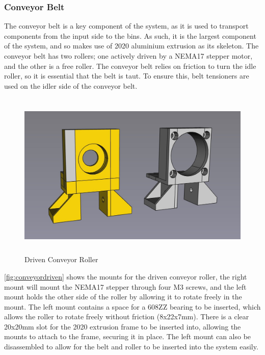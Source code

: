 \subsubsection{Conveyor Belt}
\label{sec:conveyor-belt}
The conveyor belt is a key component of the system, as it is used to transport components from the input side to the bins. As such, it is the largest component of the system, and so makes use of 2020 aluminium extrusion as its skeleton. The conveyor belt has two rollers; one actively driven by a NEMA17 stepper motor, and the other is a free roller. The conveyor belt relies on friction to turn the idle roller, so it is essential that the belt is taut. To ensure this, belt tensioners are used on the idler side of the conveyor belt.

\begin{figure}[H]
    \begin{minipage}[h]{0.95\textwidth}
        \centering
        \includegraphics[height=8cm]{imgs/freecad/conveyor_driven.jpg}
        \caption{Driven Conveyor Roller}
        \label{fig:conveyordriven}
    \end{minipage}
\end{figure}

\autoref{fig:conveyordriven} shows the mounts for the driven conveyor roller, the right mount will mount the NEMA17 stepper through four M3 screws, and the left mount holds the other side of the roller by allowing it to rotate freely in the mount. The left mount contains a space for a 608ZZ bearing to be inserted, which allows the roller to rotate freely without friction (8x22x7mm). There is a clear 20x20mm slot for the 2020 extrusion frame to be inserted into, allowing the mounts to attach to the frame, securing it in place. The left mount can also be disassembled to allow for the belt and roller to  be inserted into the system easily.

